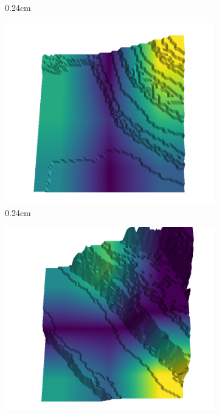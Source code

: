 \documentclass[../document.tex]{subfiles}
\begin{document}
\begin{figure}[H]
\begin{subfigure}[b]{0.242\linewidth}
            \caption{0.24cm}
            \end{subfigure}
            \begin{subfigure}[b]{0.242\linewidth}
            \includegraphics[width=\linewidth]{../img/5/quarry/false_positive/39-patch-3d-majavi-colormap-80.png}
            \caption{0.24cm}
            \end{subfigure}
            \begin{subfigure}[b]{0.242\linewidth}
            \includegraphics[width=\linewidth]{../img/5/quarry/false_positive/44-patch-3d-majavi-colormap-85.png}

\end{subfigure}
\end{figure}
\end{document}
